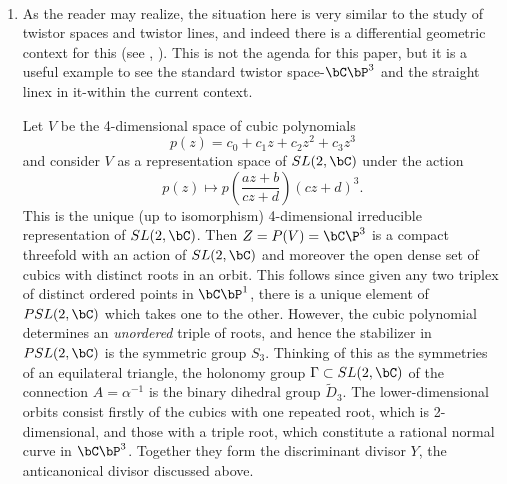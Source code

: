 \begin{example*}
~

\begin{enumerate}[()]
\item As the reader may realize, the situation here is very similar to the study of twistor spaces and twistor lines, and indeed there is a differential geometric context for this (see \cite{art7-key6}, \cite{art7-key7}). This is not the agenda for this paper, but it is a useful example to see the standard twistor space-$\bC\bP^{3}$ and the straight linex in it-within the current context.

Let $V$ be the 4-dimensional space of cubic polynomials
$$
p(z)=c_{0} + c_{1}z +c_{2}z^{2} + c_{3}z^{3}
$$
and consider $V$ as a representation space of $SL(2, \bC)$ under the action
$$
p(z)\mapsto p \left( \dfrac{az + b}{cz + d}\right)(cz + d)^{3}.
$$
This is the unique (up to isomorphism) 4-dimensional irreducible representation of $SL(2, \bC)$. Then $Z= P(V) = \bC\P^{3}$ is a compact threefold with an action of $SL(2, \bC)$ and moreover the open dense set of cubics with distinct roots in an orbit. This follows since given any two triplex of distinct ordered points in $\bC\bP^{1}$, there is a unique element of $PSL(2, \bC)$ which takes one to the other. However, the cubic polynomial determines an \textit{unordered} triple of roots, and hence the stabilizer in $PSL(2, \bC)$ is the symmetric group $S_{3}$. Thinking of this as the symmetries of an equilateral triangle, the holonomy group $\Gamma \subset SL(2, \bC)$ of the connection $A= \alpha^{-1}$ is the binary dihedral group $\tilde{D}_{3}$. The lower-dimensional orbits consist firstly of the cubics with one repeated root, which is
2-dimensional, and those with a triple root, which constitute a rational normal curve in $\bC\bP^{3}$. Together they form the discriminant divisor $Y$, the anticanonical divisor discussed above.


\end{enumerate}
\end{example*}
